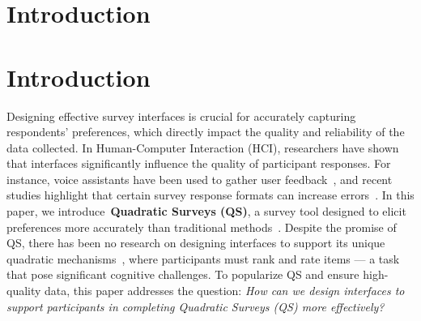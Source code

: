 \section{Introduction}



\section{Introduction}
Designing effective survey interfaces is crucial for accurately capturing respondents' preferences, which directly impact the quality and reliability of the data collected. In Human-Computer Interaction (HCI), researchers have shown that interfaces significantly influence the quality of participant responses. For instance, voice assistants have been used to gather user feedback~\cite{xiaoLetMeAsk2021}, and recent studies highlight that certain survey response formats can increase errors~\cite{pielotDidYouMisclick2024}. In this paper, we introduce~\textbf{Quadratic Surveys (QS)}, a survey tool designed to elicit preferences more accurately than traditional methods~\cite{chengCanShowWhat2021}. Despite the promise of QS, there has been no research on designing interfaces to support its unique quadratic mechanisms~\cite{grovesOptimalAllocationPublic1977}, where participants must rank and rate items --- a task that pose significant cognitive challenges. To popularize QS and ensure high-quality data, this paper addresses the question: \textit{How can we design interfaces to support participants in completing Quadratic Surveys (QS) more effectively?}

